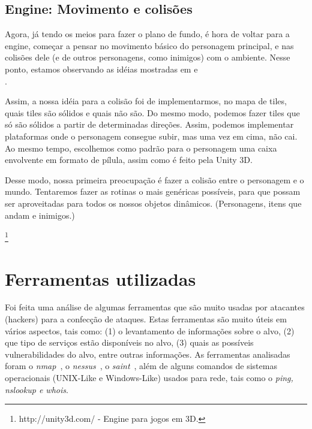 \documentclass[brazil]{abnt}
\begin{document}
\section{Engine: Movimento e colisões}

Agora, já tendo os meios para fazer o plano de fundo, é hora de voltar para a engine, começar a pensar no movimento básico do personagem principal, e nas colisões dele (e de outros personagens, como inimigos) com o ambiente. Nesse ponto, estamos observando as idéias mostradas em \cite[N Tutorial A]{NCollisionA} e \\\cite[N Tutorial B]{NCollisionB}.

Assim, a nossa idéia para a colisão foi de implementarmos, no mapa de tiles, quais tiles são sólidos e quais não são. Do mesmo modo, podemos fazer tiles que só são sólidos a partir de determinadas direções. Assim, podemos implementar plataformas onde o personagem consegue subir, mas uma vez em cima, não cai. Ao mesmo tempo, escolhemos como padrão para o personagem uma caixa envolvente em formato de pílula, assim como é feito pela Unity 3D.\footnotemark

Desse modo, nossa primeira preocupação é fazer a colisão entre o personagem e o mundo. Tentaremos fazer as rotinas o mais genéricas possíveis, para que possam ser aproveitadas para todos os nossos objetos dinâmicos. (Personagens, itens que andam e inimigos.)

\footnote{http://unity3d.com/ - Engine para jogos em 3D.}

\chapter{Ferramentas utilizadas}

Foi feita uma análise de algumas ferramentas que são muito usadas
por atacantes (hackers) para a confecção de ataques. Estas ferramentas
são muito úteis em vários aspectos, tais como: (1) o levantamento
de informações sobre o alvo, (2) que tipo de serviços estão disponíveis
no alvo, (3) quais as possíveis vulnerabilidades do alvo, entre outras
informações. As ferramentas analisadas foram o \emph{nmap}~,
o \emph{nessus}~, o \emph{saint}~, além
de alguns comandos de sistemas operacionais (UNIX-Like e Windows-Like)
usados para rede, tais como o \emph{ping, nslookup e whois}. 
\end{document}
